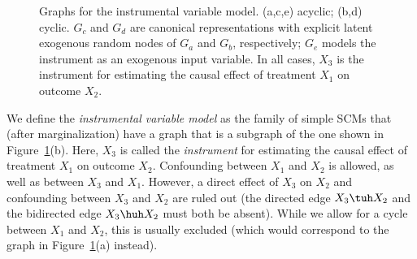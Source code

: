\begin{figure}
  \caption{Graphs for the instrumental variable model. (a,c,e) acyclic; (b,d) cyclic. $G_c$ and $G_d$ are canonical representations with explicit latent exogenous random nodes of $G_a$ and $G_b$, respectively; $G_e$ models the instrument as an exogenous input variable. In all cases, $X_3$ is the instrument for estimating the causal effect of treatment $X_1$ on outcome $X_2$.\label{fig:IV_model}}
\end{figure}

We define the \emph{instrumental variable model} as the family of simple SCMs that (after marginalization) have a graph that is a subgraph of the one shown in Figure~\ref{fig:IV_model}(b).
Here, $X_3$ is called the \emph{instrument} for estimating the causal effect of treatment $X_1$ on outcome $X_2$.
Confounding between $X_1$ and $X_2$ is allowed, as well as between $X_3$ and $X_1$.
However, a direct effect of $X_3$ on $X_2$ and confounding between $X_3$ and $X_2$ are ruled out (the directed edge $X_3 \tuh X_2$ and the bidirected edge $X_3 \huh X_2$ must both be absent).
While we allow for a cycle between $X_1$ and $X_2$, this is usually excluded (which would correspond to the graph in Figure~\ref{fig:IV_model}(a) instead).

